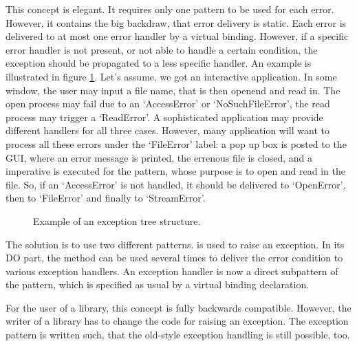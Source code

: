 This concept is elegant.  It requires only one pattern to be used
for each error.  However, it contains the big backdraw, that
error delivery is static.  Each error is delivered to at most one
error handler by a virtual binding.  However, if a specific error
handler is not present, or not able to handle a certain
condition, the exception should be propagated to a less specific
handler.  An example is illustrated in figure \ref{exc-tree}.
Let's assume, we got an interactive application.  In some window,
the user may input a file name, that is then openend and read in.
The open process may fail due to an `AccessError' or
`NoSuchFileError', the read process may trigger a `ReadError'.  A
sophisticated application may provide different handlers for all
three cases.  However, many application will want to process all
these errors under the `FileError' label: a pop up box is posted
to the GUI, where an error message is printed, the errenous file
is closed, and a  imperative is executed for the
pattern, whose purpose is to open and read in the file.  So, if
an `AccessError' is not handled, it should be delivered to
`OpenError', then to `FileError' and finally to `StreamError'.

\begin{figure}[tbp]
\centerline{}
\caption{Example of an exception tree structure.}
\label{exc-tree}
\end{figure}
The solution is to use two different patterns.   is
used to raise an exception.  In its DO part, the 
method can be used several times to deliver the error condition
to various exception handlers.  An exception handler is now a
direct subpattern of the  pattern, which is
specified as usual by a virtual binding declaration.

For the user of a library, this concept is fully backwards
compatible.  However, the writer of a library has to change the
code for raising an exception.  The exception pattern is written
such, that the old-style exception handling is still possible,
too.
